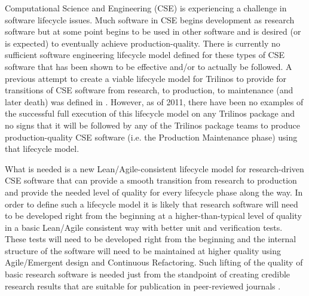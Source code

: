\documentclass[11pt]{SANDreport}
\begin{document}
\begin{floatingfigure}[r]{0.5\textwidth}
\begin{center}
\end{center}
\end{floatingfigure}

Computational Science and Engineering (CSE) is experiencing a
challenge in software lifecycle issues.  Much software in CSE begins
development as research software but at some point begins to be used
in other software and is desired (or is expected) to eventually
achieve production-quality.  There is currently no sufficient software
engineering lifecycle model defined for these types of CSE software
that has been shown to be effective and/or to actually be followed.  A
previous attempt to create a viable lifecycle model for Trilinos to
provide for transitions of CSE software from research, to production,
to maintenance (and later death) was defined in
{}\cite{TrilinosLifecycleModel2007}.  However, as of 2011, there have
been no examples of the successful full execution of this lifecycle
model on any Trilinos package and no signs that it will be followed by
any of the Trilinos package teams to produce production-quality CSE
software (i.e. the Production Maintenance phase) using that lifecycle
model.

What is needed is a new Lean/Agile-consistent lifecycle model for
research-driven CSE software that can provide a smooth transition from
research to production and provide the needed level of quality for
every lifecycle phase along the way.  In order to define such a
lifecycle model it is likely that research software will need to be
developed right from the beginning at a higher-than-typical level of
quality in a basic Lean/Agile consistent way with better unit and
verification tests.  These tests will need to be developed right from
the beginning and the internal structure of the software will need to
be maintained at higher quality using Agile/Emergent design and
Continuous Refactoring.  Such lifting of the quality of basic research
software is needed just from the standpoint of creating credible
research results that are suitable for publication in peer-reviewed
journals {}\cite{CompSciDemandsNewParadigm05,
ScientistsNightmareFiveRetractions2006}.
\end{document}
